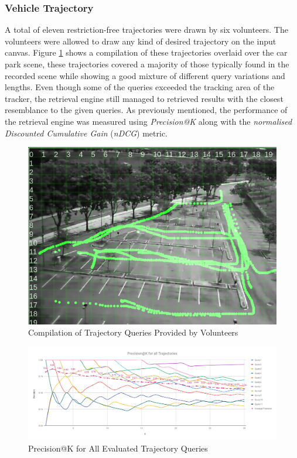 \subsubsection{Vehicle Trajectory}
A total of eleven restriction-free trajectories were drawn by six volunteers. The volunteers were allowed to draw any kind of desired trajectory on the input canvas. Figure \ref{fig:versionTwoTrajquery} shows a compilation of these trajectories overlaid over the car park scene, these trajectories covered a majority of those typically found in the recorded scene while showing a good mixture of different query variations and lengths. Even though some of the queries exceeded the tracking area of the tracker, the retrieval engine still managed to retrieved results with the closest resemblance to the given queries. As previously mentioned, the performance of the retrieval engine was measured using \textit{Precision@K} along with the \textit{normalised Discounted Cumulative Gain} (\textit{nDCG}) metric.
\begin{figure}[!t]
  \centering
    \includegraphics[width=0.8\linewidth]{image/retrievalTwo/trajquery.png}
  \caption{Compilation of Trajectory Queries Provided by Volunteers}
  \label{fig:versionTwoTrajquery}
\end{figure}
\begin{figure}[!t]
  \centering
    \includegraphics[width=\linewidth]{image/retrievalTwo/p@k.png}
  \caption{Precision@K for All Evaluated Trajectory Queries}
  \label{fig:versionTwoPreAtK}
\end{figure}

